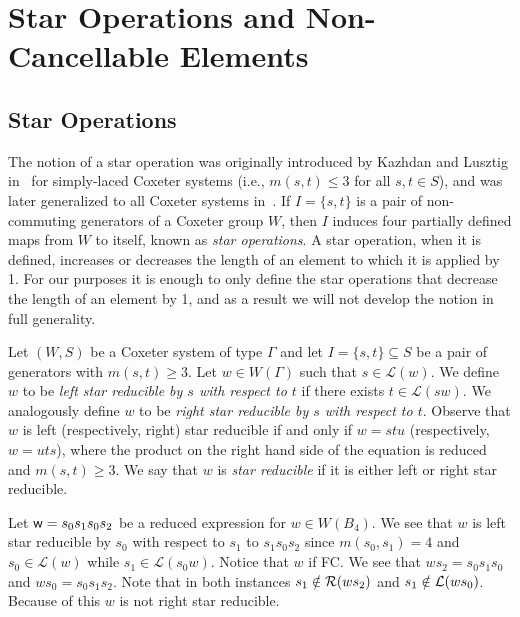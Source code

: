 \chapter{Star Operations and Non-Cancellable Elements}


\section{Star Operations}\label{sec:star}

The notion of a star operation was originally introduced by Kazhdan and Lusztig in~\cite{Kazhdan1979} for simply-laced Coxeter systems (i.e., $m(s,t) \leq 3$ for all $s,t \in S$), and was later generalized to all Coxeter systems in~\cite{Lusztig1985}. If $I=\{s,t\}$ is a pair of non-commuting generators of a Coxeter group $W$, then $I$ induces four partially defined maps from $W$ to itself, known as \emph{star operations}. A star operation, when it is defined, increases or decreases the length of an element to which it is applied by 1. For our purposes it is enough to only define the star operations that decrease the length of an element by 1, and as a result we will not develop the notion in full generality.

Let $(W,S)$ be a Coxeter system of type $\Gamma$ and let $I=\{s,t\}\subseteq S$ be a pair of generators with $m(s,t) \geq 3$. Let $w \in W(\Gamma)$ such that $s \in \mathcal{L}(w)$. We define $w$ to be \emph{left star reducible by $s$ with respect to $t$} if there exists $t \in \mathcal{L}(sw)$. We analogously define $w$ to be \emph{right star reducible by $s$ with respect to $t$}. Observe that $w$ is left (respectively, right) star reducible if and only if $w=stu$ (respectively, $w=uts$), where the product on the right hand side of the equation is reduced and $m(s,t) \geq 3$. We say that $w$ is \emph{star reducible} if it is either left or right star reducible.

\begin{example}\label{ex:starred}
Let $\mathsf{w}=s_0s_1s_0s_2$ be a reduced expression for $w \in W(B_4)$. We see that $w$ is left star reducible by $s_0$ with respect to $s_1$ to $s_1s_0s_2$ since $m(s_0,s_1)=4$ and $s_0 \in \mathcal{L}(w)$ while $s_1 \in \mathcal{L}(s_0w)$. Notice that $w$ if FC. We see that $ws_2=s_0s_1s_0$ and $ws_0=s_0s_1s_2$. Note that in both instances $s_1 \notin \mathcal{R}(ws_2)$ and $s_1 \notin \mathcal{L}(ws_0)$. Because of this $w$ is not right star reducible. 
\end{example}

